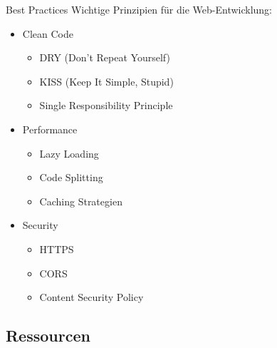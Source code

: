 \begin{KR}{Best Practices}
    Wichtige Prinzipien für die Web-Entwicklung:
    \begin{itemize}
        \item Clean Code
            \begin{itemize}
                \item DRY (Don't Repeat Yourself)
                \item KISS (Keep It Simple, Stupid)
                \item Single Responsibility Principle
            \end{itemize}
        \item Performance
            \begin{itemize}
                \item Lazy Loading
                \item Code Splitting
                \item Caching Strategien
            \end{itemize}
        \item Security
            \begin{itemize}
                \item HTTPS
                \item CORS
                \item Content Security Policy
            \end{itemize}
    \end{itemize}
\end{KR}

\subsection{Ressourcen}


